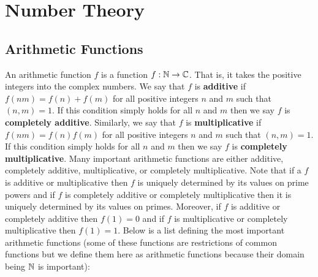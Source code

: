 \appendix
\chapter{Number Theory}
  \section{Arithmetic Functions}\label{append:Arithmetic_Functions}
    An arithmetic function $f$ is a function $f:\mathbb{N} \to \mathbb{C}$. That is, it takes the positive integers into the complex numbers. We say that $f$ is \textbf{additive} if $f(nm) = f(n)+f(m)$ for all positive integers $n$ and $m$ such that $(n,m) = 1$. If this condition simply holds for all $n$ and $m$ then we say $f$ is \textbf{completely additive}. Similarly, we say that $f$ is \textbf{multiplicative} if $f(nm) = f(n)f(m)$ for all positive integers $n$ and $m$ such that $(n,m) = 1$. If this condition simply holds for all $n$ and $m$ then we say $f$ is \textbf{completely multiplicative}. Many important arithmetic functions are either additive, completely additive, multiplicative, or completely multiplicative. Note that if a $f$ is additive or multiplicative then $f$ is uniquely determined by its values on prime powers and if $f$ is completely additive or completely multiplicative then it is uniquely determined by its values on primes. Moreover, if $f$ is additive or completely additive then $f(1) = 0$ and if $f$ is multiplicative or completely multiplicative then $f(1) = 1$. Below is a list defining the most important arithmetic functions (some of these functions are restrictions of common functions but we define them here as arithmetic functions because their domain being $\mathbb{N}$ is important):
